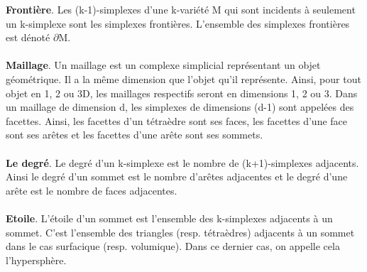 \textbf{Frontière}. Les (k-1)-simplexes d'une k-variété M qui sont incidents à seulement un k-simplexe sont les simplexes frontières. L'ensemble des simplexes frontières est dénoté $\partial $M.\\\\
\textbf{Maillage}. Un maillage est un complexe simplicial représentant un objet géométrique. Il a la même dimension que l'objet qu'il représente. Ainsi, pour tout objet en 1, 2 ou 3D, les maillages respectifs seront en dimensions 1, 2 ou 3. Dans un maillage de dimension d, les simplexes de dimensions (d-1) sont appelées des facettes. Ainsi, les facettes d'un tétraèdre sont ses faces, les facettes d'une face sont ses arêtes et les facettes d'une arête sont ses sommets.\\\\
\textbf{Le degré}. Le degré d'un k-simplexe est le nombre de (k+1)-simplexes adjacents. Ainsi le degré d'un sommet est le nombre d'arêtes adjacentes et le degré d'une arête est le nombre de faces adjacentes.\\\\
\textbf{Etoile}. L'étoile d'un sommet est l'ensemble des k-simplexes adjacents à un sommet. C'est l'ensemble des triangles (resp. tétraèdres) adjacents à un sommet dans le cas surfacique (resp. volumique). Dans ce dernier cas, on appelle cela l'hypersphère.


